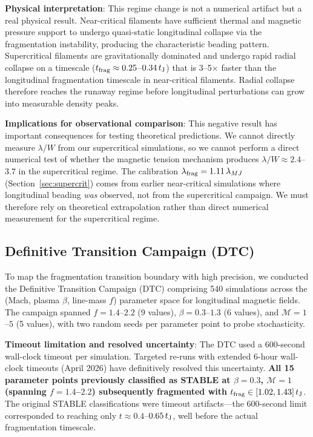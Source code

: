 \documentclass[twocolumn]{mnras}
\begin{document}
\textbf{Physical interpretation}: This regime change is not a numerical artifact but a real physical result. Near-critical filaments have sufficient thermal and magnetic pressure support to undergo quasi-static longitudinal collapse via the fragmentation instability, producing the characteristic beading pattern. Supercritical filaments are gravitationally dominated and undergo rapid radial collapse on a timescale ($t_{\rm frag} \approx 0.25$--$0.34\,t_{\rm J}$) that is 3--5$\times$ faster than the longitudinal fragmentation timescale in near-critical filaments. Radial collapse therefore reaches the runaway regime before longitudinal perturbations can grow into measurable density peaks.

\textbf{Implications for observational comparison}: This negative result has important consequences for testing theoretical predictions. We cannot directly measure $\lambda/W$ from our supercritical simulations, so we cannot perform a direct numerical test of whether the magnetic tension mechanism produces $\lambda/W \approx 2.4$--$3.7$ in the supercritical regime. The calibration $\lambda_{\rm frag} = 1.11\,\lambda_{MJ}$ (Section~\ref{sec:supercrit}) comes from earlier near-critical simulations where longitudinal beading \textit{was} observed, not from the supercritical campaign. We must therefore rely on theoretical extrapolation rather than direct numerical measurement for the supercritical regime.

\subsection{Definitive Transition Campaign (DTC)}
\label{sec:dtc}

To map the fragmentation transition boundary with high precision, we conducted the Definitive Transition Campaign (DTC) comprising 540 simulations across the (Mach, plasma $\beta$, line-mass $f$) parameter space for longitudinal magnetic fields. The campaign spanned $f = 1.4$--$2.2$ (9 values), $\beta = 0.3$--$1.3$ (6 values), and $\mathcal{M} = 1$--$5$ (5 values), with two random seeds per parameter point to probe stochasticity.

\textbf{Timeout limitation and resolved uncertainty}: The DTC used a 600-second wall-clock timeout per simulation. Targeted re-runs with extended 6-hour wall-clock timeouts (April 2026) have definitively resolved this uncertainty. \textbf{All 15 parameter points previously classified as STABLE at $\beta = 0.3$, $\mathcal{M} = 1$ (spanning $f = 1.4$--$2.2$) subsequently fragmented with $t_{\rm frag} \in [1.02, 1.43]\,t_{\rm J}$}. The original STABLE classifications were timeout artifacts—the 600-second limit corresponded to reaching only $t \approx 0.4$--$0.65\,t_{\rm J}$, well before the actual fragmentation timescale.
\end{document}

